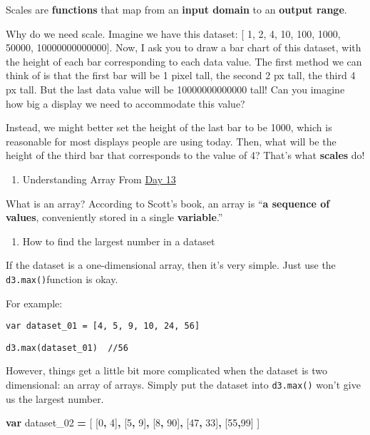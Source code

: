 \documentclass[
]{book}
\newenvironment{Shaded}{\begin{snugshade}}{\end{snugshade}}
\newcommand{\DecValTok}[1]{\textcolor[rgb]{0.00,0.00,0.81}{#1}}
\newcommand{\KeywordTok}[1]{\textcolor[rgb]{0.13,0.29,0.53}{\textbf{#1}}}
\newcommand{\NormalTok}[1]{#1}
\newcommand{\OperatorTok}[1]{\textcolor[rgb]{0.81,0.36,0.00}{\textbf{#1}}}
\providecommand{\tightlist}{%
  \setlength{\itemsep}{0pt}\setlength{\parskip}{0pt}}
\begin{document}
Scales are \textbf{functions} that map from an \textbf{input domain} to an \textbf{output range}.

Why do we need scale. Imagine we have this dataset: {[} 1, 2, 4, 10, 100, 1000, 50000, 10000000000000{]}. Now, I ask you to draw a bar chart of this dataset, with the height of each bar corresponding to each data value. The first method we can think of is that the first bar will be 1 pixel tall, the second 2 px tall, the third 4 px tall. But the last data value will be 10000000000000 tall! Can you imagine how big a display we need to accommodate this value?

Instead, we might better set the height of the last bar to be 1000, which is reasonable for most displays people are using today. Then, what will be the height of the third bar that corresponds to the value of 4? That's what \textbf{scales} do!

\begin{enumerate}
\def\labelenumi{\arabic{enumi}.}
\setcounter{enumi}{1}
\tightlist
\item
  Understanding Array
  From \href{https://observablehq.com/@hongtaoh/day-thirteen-2020-09-06}{Day 13}
\end{enumerate}

What is an array? According to Scott's book, an array is ``\textbf{a sequence of values}, conveniently stored in a single \textbf{variable}.''

\begin{enumerate}
\def\labelenumi{\arabic{enumi}.}
\setcounter{enumi}{2}
\tightlist
\item
  How to find the largest number in a dataset
\end{enumerate}

If the dataset is a one-dimensional array, then it's very simple. Just use the \texttt{d3.max()}function is okay.

For example:

\texttt{var\ dataset\_01\ =\ {[}4,\ 5,\ 9,\ 10,\ 24,\ 56{]}}

\texttt{d3.max(dataset\_01)\ \ //56}

However, things get a little bit more complicated when the dataset is two dimensional: an array of arrays. Simply put the dataset into \texttt{d3.max()} won't give us the largest number.

\begin{Shaded}
\begin{Highlighting}[]
\KeywordTok{var}\NormalTok{ dataset\_02 }\OperatorTok{=}\NormalTok{ [}
\NormalTok{  [}\DecValTok{0}\OperatorTok{,} \DecValTok{4}\NormalTok{]}\OperatorTok{,}\NormalTok{ [}\DecValTok{5}\OperatorTok{,} \DecValTok{9}\NormalTok{]}\OperatorTok{,}\NormalTok{ [}\DecValTok{8}\OperatorTok{,} \DecValTok{90}\NormalTok{]}\OperatorTok{,}\NormalTok{ [}\DecValTok{47}\OperatorTok{,} \DecValTok{33}\NormalTok{]}\OperatorTok{,}\NormalTok{ [}\DecValTok{55}\OperatorTok{,}\DecValTok{99}\NormalTok{]}
\NormalTok{  ]}
\end{Highlighting}
\end{Shaded}
\end{document}
